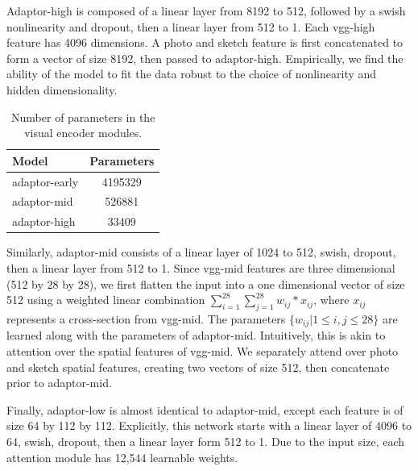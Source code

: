 \documentclass[9pt,twocolumn,twoside]{pnas-new}
\begin{document}
{Adaptor-high is composed of a linear layer from 8192 to 512, followed by a swish nonlinearity \cite[]{ramachandran2018searching} and dropout, then a linear layer from 512 to 1. Each vgg-high feature has 4096 dimensions. A photo and sketch feature is first concatenated to form a vector of size 8192, then passed to adaptor-high. Empirically, we find the ability of the model to fit the data robust to the choice of nonlinearity and hidden dimensionality.

\begin{table}
\centering
\begin{tabular}{| l | c |}
\hline
Model & Parameters \\
\hline
\hline
adaptor-early & 4195329 \\
\hline
adaptor-mid & 526881 \\
\hline
adaptor-high & 33409 \\
\hline
\end{tabular}
\caption{Number of parameters in the visual encoder modules.}
\label{table:parameters}
\end{table}

Similarly, adaptor-mid consists of a linear layer of 1024 to 512, swish, dropout, then a linear layer from 512 to 1. Since vgg-mid features are three dimensional (512 by 28 by 28), we first flatten the input into a one dimensional vector of size 512 using a weighted linear combination $\sum_{i=1}^{28}\sum_{j=1}^{28} w_{ij} * x_{ij}$, where $x_{ij}$ represents a cross-section from vgg-mid. The parameters $\{w_{ij}|1\leq i,j \leq 28\}$ are learned along with the parameters of adaptor-mid. Intuitively, this is akin to attention over the spatial features of vgg-mid. We separately attend over photo and sketch spatial features, creating two vectors of size 512, then concatenate prior to adaptor-mid.

Finally, adaptor-low is almost identical to adaptor-mid, except each feature is of size 64 by 112 by 112. Explicitly, this network starts with a linear layer of 4096 to 64, swish, dropout, then a linear layer form 512 to 1. Due to the input size, each attention module has 12,544 learnable weights.

}
\end{document}
